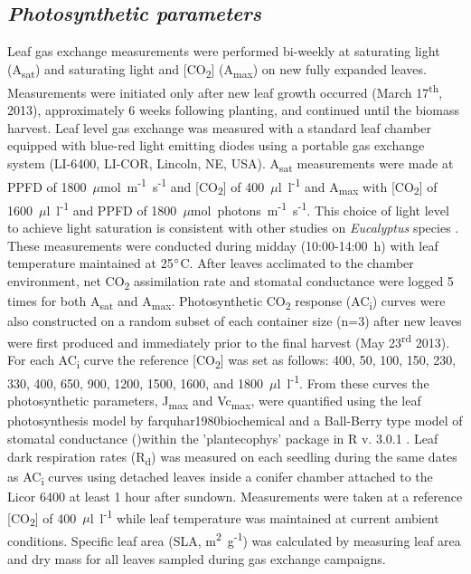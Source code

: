 \documentclass[a4paper]{article}\usepackage[]{graphicx}\usepackage[]{color}
\begin{document}
\subsection*{\textit{Photosynthetic parameters}}
Leaf gas exchange measurements were performed bi-weekly at saturating light (A\textsubscript{sat}) and saturating light and [CO\textsubscript{2}] (A\textsubscript{max}) on new fully expanded leaves. Measurements were initiated only after new leaf growth occurred (March 17\textsuperscript{th}, 2013), approximately 6 weeks following planting, and continued until the biomass harvest. Leaf level gas exchange was measured with a standard leaf chamber equipped with blue-red light emitting diodes using a portable gas exchange system (LI-6400, LI-COR, Lincoln, NE, USA). A\textsubscript{sat} measurements were made at PPFD of 1800~$\mu$mol~m\textsuperscript{-1}~s\textsuperscript{-1} and [CO\textsubscript{2}] of 400~$\mu$l~l\textsuperscript{-1} and A\textsubscript{max} with [CO\textsubscript{2}] of 1600~$\mu$l~l\textsuperscript{-1} and PPFD of 1800~$\mu$mol~photons~m\textsuperscript{-1}~s\textsuperscript{-1}. This choice of light level to achieve light saturation is consistent with other studies on \textit{Eucalyptus} species \citep{kallarackal1997ecophysiological,pinkard1998photosynthetic,crous2013photosynthesis,drake2014capacity}. These measurements were conducted during midday (10:00-14:00~h) with leaf temperature maintained at 25$\degree$C. After leaves acclimated to the chamber environment, net CO\textsubscript{2} assimilation rate and stomatal conductance were logged 5 times for both A\textsubscript{sat} and A\textsubscript{max}. Photosynthetic CO\textsubscript{2} response (AC\textsubscript{i}) curves were also constructed on a random subset of each container size (n=3) after new leaves were first produced and immediately prior to the final harvest (May 23\textsuperscript{rd} 2013). For each AC\textsubscript{i} curve the reference [CO\textsubscript{2}] was set as follows:  400, 50, 100, 150, 230, 330, 400, 650, 900, 1200, 1500, 1600, and 1800~$\mu$l~l\textsuperscript{-1}. From these curves the photosynthetic parameters, J\textsubscript{max} and Vc\textsubscript{max}, were quantified using the leaf photosynthesis model by farquhar1980biochemical and a Ball-Berry type model of stomatal conductance ()within the 'plantecophys' package in R v. 3.0.1 \citep{plantecophys,RDevelopmentCoreTeam2011}.  Leaf dark respiration rates (R\textsubscript{d}) was measured on each seedling during the same dates as AC\textsubscript{i} curves using detached leaves inside a conifer chamber attached to the Licor 6400 at least 1 hour after sundown.   Measurements were taken at a reference [CO\textsubscript{2}] of 400~$\mu$l~l\textsuperscript{-1} while leaf temperature was maintained at current ambient conditions. Specific leaf area (SLA, m\textsuperscript{2}~g\textsuperscript{-1}) was calculated by measuring leaf area and dry mass for all leaves sampled during gas exchange campaigns.
\end{document}
